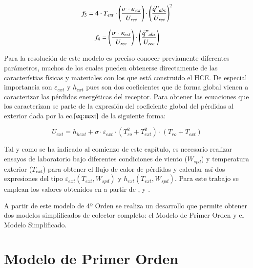 \begin{equation}
    f_{3} = 4 \cdot T_{ext} \cdot \left(\frac{\sigma \cdot \varepsilon_{ext}}{U_{rec}} \right) \cdot \left(\frac{\dot{q}"_{abs}}{U_{rec}}\right)^{2} 
    \label{eq:f3}
\end{equation}

\begin{equation}
    f_{4} = \left(\frac{\sigma \cdot \varepsilon_{ext}}{U_{rec}} \right) \cdot \left(\frac{\dot{q}"_{abs}}{U_{rec}}\right) 
    \label{eq:f4}
\end{equation}

Para la resolución de este modelo es preciso conocer previamente diferentes parámetros, muchos de los cuales pueden obtenerse directamente de las característias físicas y materiales con los que está construido el HCE. De especial importancia son \(\varepsilon_{ext}\) y \(h_{ext}\) pues son dos coeficientes que de forma global vienen a caracterizar las pérdidas energéticas del receptor. Para obtener las ecuaciones que los caracterizan se parte de la expresión del coeficiente global del pérdidas al exterior dada por la ec.\(\eqref{eq:uext}\) de la siguiente forma:

\begin{equation}
    U_{ext} = h_{hext} + \sigma \cdot \varepsilon_{ext} \cdot \left(T_{ro}^2 + T_{ext}^2 \right) \cdot \left(T_{ro} + T_{ext} \right)
    \label{eq:uext}
\end{equation}

Tal y como se ha indicado al comienzo de este capítulo, es necesario realizar ensayos de laboratorio bajo diferentes condiciones de viento (\(W_{spd}\)) y temperatura exterior (\(T_{ext}\)) para obtener el flujo de calor de pérdidas y calcular así dos expresiones del tipo \(\varepsilon_{ext}(T_{ext},W_{spd})\) y \(h_{ext}(T_{ext},W_{spd})\). Para este trabajo se emplean los valores obtenidos en \cite{barberofresnoDesarrolloModeloTeorico2018} a partir de \cite{burkholderHeatLossTestingSolel2008}, \cite{burkholderHeatLossTesting2009} y \cite{kutscherGenerationParabolicTrough2012}.

A partir de este modelo de 4º Orden se realiza un desarrollo que permite obtener dos modelos simplificados de colector completo: el Modelo de Primer Orden y el Modelo Simplificado.

\section{Modelo de Primer Orden}

